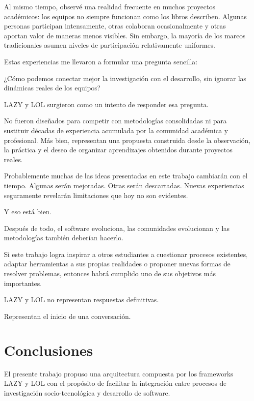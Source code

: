 \documentclass[14pt,a4paper,oneside]{extbook}
\begin{document}
Al mismo tiempo, observé una realidad frecuente en muchos proyectos académicos: los equipos no siempre funcionan como los libros describen. Algunas personas participan intensamente, otras colaboran ocasionalmente y otras aportan valor de maneras menos visibles. Sin embargo, la mayoría de los marcos tradicionales asumen niveles de participación relativamente uniformes.

Estas experiencias me llevaron a formular una pregunta sencilla:

\begin{keyquestion}
¿Cómo podemos conectar mejor la investigación con el desarrollo, sin ignorar las dinámicas reales de los equipos?
\end{keyquestion}

LAZY y LOL surgieron como un intento de responder esa pregunta.

No fueron diseñados para competir con metodologías consolidadas ni para sustituir décadas de experiencia acumulada por la comunidad académica y profesional. Más bien, representan una propuesta construida desde la observación, la práctica y el deseo de organizar aprendizajes obtenidos durante proyectos reales.

Probablemente muchas de las ideas presentadas en este trabajo cambiarán con el tiempo. Algunas serán mejoradas. Otras serán descartadas. Nuevas experiencias seguramente revelarán limitaciones que hoy no son evidentes.

Y eso está bien.

Después de todo, el software evoluciona, las comunidades evolucionan y las metodologías también deberían hacerlo.

Si este trabajo logra inspirar a otros estudiantes a cuestionar procesos existentes, adaptar herramientas a sus propias realidades o proponer nuevas formas de resolver problemas, entonces habrá cumplido uno de sus objetivos más importantes.

LAZY y LOL no representan respuestas definitivas.

Representan el inicio de una conversación.



\chapter{Conclusiones}

El presente trabajo propuso una arquitectura compuesta por los frameworks LAZY y LOL con el propósito de facilitar la integración entre procesos de investigación socio-tecnológica y desarrollo de software.
\end{document}
